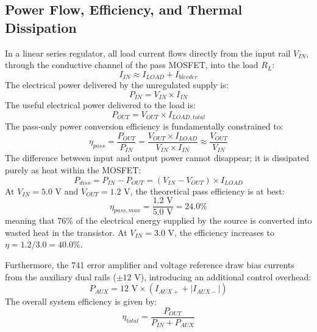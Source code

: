 \documentclass[11pt,a4paper]{article}
\begin{document}
\subsection{Power Flow, Efficiency, and Thermal Dissipation}
In a linear series regulator, all load current flows directly from the input rail $V_{IN}$, through the conductive channel of the pass MOSFET, into the load $R_L$:
\begin{equation}
    I_{IN} \approx I_{LOAD} + I_{bleeder}
\end{equation}
The electrical power delivered by the unregulated supply is:
\begin{equation}
    P_{IN} = V_{IN} \times I_{IN}
\end{equation}
The useful electrical power delivered to the load is:
\begin{equation}
    P_{OUT} = V_{OUT} \times I_{LOAD,total}
\end{equation}
The pass-only power conversion efficiency is fundamentally constrained to:
\begin{equation}
    \eta_{pass} = \frac{P_{OUT}}{P_{IN}} = \frac{V_{OUT} \times I_{LOAD}}{V_{IN} \times I_{IN}} \approx \frac{V_{OUT}}{V_{IN}}
\end{equation}
The difference between input and output power cannot disappear; it is dissipated purely as heat within the MOSFET:
\begin{equation}
    P_{diss} = P_{IN} - P_{OUT} = (V_{IN} - V_{OUT}) \times I_{LOAD}
\end{equation}
At $V_{IN} = 5.0\text{ V}$ and $V_{OUT} = 1.2\text{ V}$, the theoretical pass efficiency is at best:
\begin{equation}
    \eta_{pass,max} = \frac{1.2\text{ V}}{5.0\text{ V}} = 24.0\%
\end{equation}
meaning that $76\%$ of the electrical energy supplied by the source is converted into wasted heat in the transistor. At $V_{IN} = 3.0\text{ V}$, the efficiency increases to $\eta = 1.2/3.0 = 40.0\%$.

Furthermore, the 741 error amplifier and voltage reference draw bias currents from the auxiliary dual rails ($\pm 12\text{ V}$), introducing an additional control overhead:
\begin{equation}
    P_{AUX} = 12\text{ V} \times \left( I_{AUX+} + |I_{AUX-}| \right)
\end{equation}
The overall system efficiency is given by:
\begin{equation}
    \eta_{total} = \frac{P_{OUT}}{P_{IN} + P_{AUX}}
\end{equation}
\end{document}
